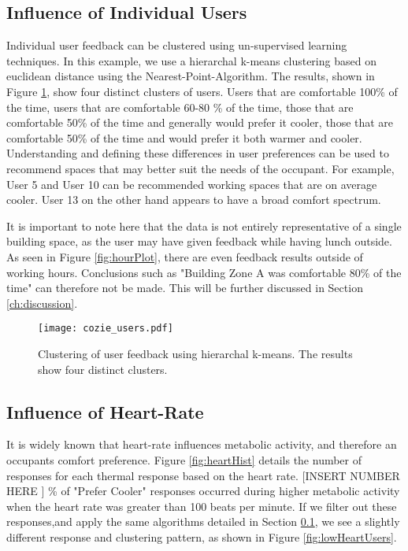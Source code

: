 \subsection{Influence of Individual Users}
\label{ch:userResults}

Individual user feedback can be clustered using un-supervised learning techniques. In this example, we use a hierarchal k-means clustering based on euclidean distance using the Nearest-Point-Algorithm. The results, shown in Figure \ref{fig:userPlot}, show four distinct clusters of users. Users that are comfortable 100\% of the time, users that are comfortable 60-80 \% of the time, those that are comfortable 50\% of the time and generally would prefer it cooler, those that are comfortable 50\% of the time and would prefer it both warmer and cooler. Understanding and defining these differences in user preferences can be used to recommend spaces that may better suit the needs of the occupant. For example, User 5 and User 10 can be recommended working spaces that are on average cooler. User 13 on the other hand appears to have a broad comfort spectrum. 

It is important to note here that the data is not entirely representative of a single building space, as the user may have given feedback while having lunch outside. As seen in Figure \ref{fig:hourPlot}, there are even feedback results outside of working hours. Conclusions such as "Building Zone A was comfortable 80\% of the time" can therefore not be made. This will be further discussed in Section \ref{ch:discussion}.


\begin{figure}
\begin{center}
\texttt{[image: cozie\_users.pdf]}
\caption{Clustering of user feedback using hierarchal k-means. The results show four distinct clusters.}
\label{fig:userPlot}
\end{center}
\end{figure}

\subsection{Influence of Heart-Rate}

It is widely known that heart-rate influences metabolic activity, and therefore an occupants comfort preference. Figure \ref{fig:heartHist} details the number of responses for each thermal response based on the heart rate. [INSERT NUMBER HERE ] \% of "Prefer Cooler" responses occurred during higher metabolic activity when the heart rate was greater than 100 beats per minute. If we filter out these responses,and apply the same algorithms detailed in Section \ref{ch:userResults}, we see a slightly different response and clustering pattern, as shown in Figure \ref{fig:lowHeartUsers}. 

